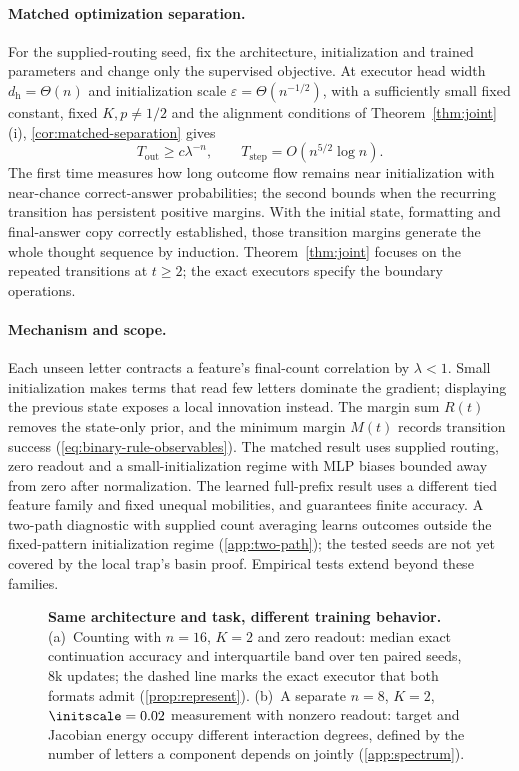 \paragraph{Matched optimization separation.}
For the supplied-routing seed, fix the architecture, initialization and trained parameters
and change only the supervised objective. At executor head width $d_{\mathrm h}=\Theta(n)$
and initialization scale $\varepsilon=\Theta(n^{-1/2})$, with a sufficiently small fixed
constant, fixed $K,p\ne1/2$ and the alignment conditions of Theorem~\ref{thm:joint}(i), \cref{cor:matched-separation} gives
\[
 T_{\mathrm{out}}\ge c\lambda^{-n},\qquad
 T_{\mathrm{step}}=O(n^{5/2}\log n).
\]
The first time measures how long outcome flow remains near initialization with
near-chance correct-answer probabilities;
the second bounds when the recurring transition has persistent positive margins.
With the initial state, formatting and final-answer copy correctly established, those
transition margins generate the whole thought sequence by induction. Theorem~\ref{thm:joint}
focuses on the repeated transitions at $t\ge2$; the exact executors specify the boundary operations.

\paragraph{Mechanism and scope.}
Each unseen letter contracts a feature's final-count correlation by $\lambda<1$.
Small initialization makes terms that read few letters dominate the gradient; displaying
the previous state exposes a local innovation instead. The margin sum $R(t)$ removes the
state-only prior, and the minimum margin $M(t)$ records transition success
(\cref{eq:binary-rule-observables}). The matched result uses supplied routing, zero readout
and a small-initialization regime with MLP biases bounded away from zero after normalization.
The learned full-prefix result uses a different tied feature family and fixed unequal
mobilities, and guarantees finite accuracy. A two-path diagnostic with supplied
count averaging learns outcomes outside the fixed-pattern initialization regime
(\cref{app:two-path}); the tested seeds are not yet covered by the local trap's basin proof.
Empirical tests extend beyond these families.

\begin{figure}[t]
\centering

\caption{\textbf{Same architecture and task, different training behavior.}
(a)~Counting with $n=16$, $K=2$ and zero readout: median exact continuation accuracy and interquartile band over ten paired seeds, $8$k
updates; the dashed line marks the exact executor that both formats admit (\cref{prop:represent}).
(b)~A separate $n=8$, $K=2$, $\initscale=0.02$ measurement with nonzero readout: target and Jacobian energy occupy different interaction degrees, defined by the number of letters a component depends on jointly (\cref{app:spectrum}).}
\label{fig:overview}
\end{figure}

